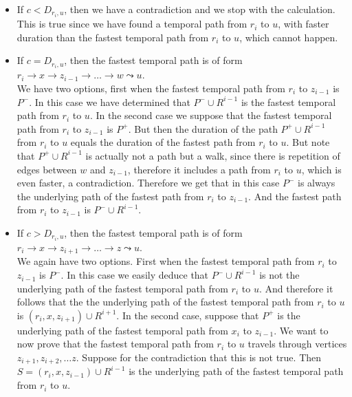 \documentclass[11pt,a4paper]{article}
\theoremstyle{remark}
\theoremstyle{definition}
\begin{document}
\begin{enumerate}[(i)]
\begin{itemize}
\begin{itemize}
            \item  If $c < D_{r_i,u}$, then we have a contradiction and we stop with the calculation.\\
            This is true since we have found a temporal path from $r_i$ to $u$, with faster duration than the fastest temporal path from $r_i$ to $u$,
            which cannot happen.
            \item  If $c = D_{r_i,u}$, then 
            the fastest temporal path is of form $r_i \rightarrow x \rightarrow z_{i-1} \rightarrow \dots \rightarrow w \leadsto u$.\\
            We have two options, first when the fastest temporal path from $r_i$ to $z_{i-1}$ is $P^-$.
            In this case we have determined that $P^- \cup R^{i-1}$ is the fastest temporal path from $r_i$ to $u$.
            In the second case we suppose that the fastest temporal path from $r_i$ to $z_{i-1}$ is $P^+$.
            But then the duration of the path $P^+ \cup R^{i-1}$ from $r_i$ to $u$ equals the duration of the fastest path from $r_i$ to $u$. But note that $P^+ \cup R^{i-1}$ is actually not a path but a walk, since there is repetition of edges between $w$ and $z_{i-1}$,
            therefore it includes a path from $r_i$ to $u$, which is even faster,
            a contradiction.
            Therefore we get that in this case $P^-$ is always the underlying path of the fastest path from $r_i$ to $z_{i-1}$.
            And the fastest path from $r_i$ to $z_{i-1}$ is $P^- \cup R^{i-1}$.
            \item If $c > D_{r_i,u}$, then 
            the fastest temporal path is of form $r_i \rightarrow x \rightarrow z_{i+1} \rightarrow \dots \rightarrow z \leadsto u$.\\
            We again have two options.
            First when the fastest temporal path from $r_i$ to $z_{i-1}$ is $P^-$.
            In this case we easily deduce that $P^- \cup R^{i-1}$ is not the underlying path of the fastest temporal path from $r_i$ to $u$.
            And therefore it follows that the the underlying path of the fastest temporal path from $r_i$ to $u$ is  $(r_i, x, z_{i+1}) \cup R^{i+1}$.
            In the second case, suppose that $P^+$ is the underlying path of the fastest temporal path from $x_i$ to $z_{i-1}$.
            We want to now prove that the fastest temporal path from $r_i$ to $u$ travels through vertices $z_{i+1}, z_{i+2}, \dots z$.
            Suppose for the contradiction that this is not true. 
            Then $S = (r_i, x, z_{i-1}) \cup R^{i-1}$ is the underlying path of the fastest temporal path from $r_i$ to $u$.

\end{itemize}
\end{itemize}
\end{enumerate}
\end{document}
